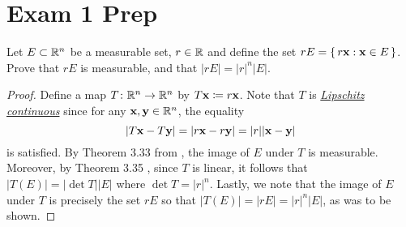 \section{Exam 1 Prep}
\begin{problem}
Let $E\subset\mathbb{R}^n$ be a measurable set, $r\in\mathbb{R}$ and define the set
$rE=\left\{\,r\mathbf{x}:\mathbf{x}\in E\,\right\}$. Prove that $rE$ is
measurable, and that $|rE|=|r|^n|E|$.
\end{problem}
\begin{proof}
Define a map $T\colon\mathbb{R}^n\to\mathbb{R}^n$ by $T\mathbf{x}\coloneqq r\mathbf{x}$. Note
that $T$ is
\href{https://en.wikipedia.org/wiki/Lipschitz_continuity}{\emph{Lipschitz
    continuous}} since for any $\mathbf{x},\mathbf{y}\in\mathbb{R}^n$, the equality
\begin{equation}
\label{eq:sp16:1:1}
|T\mathbf{x}-T\mathbf{y}|=|r\mathbf{x}-r\mathbf{y}|=|r||\mathbf{x}-\mathbf{y}|
\end{equation}
is satisfied. By Theorem 3.33 from \cite[\S 3.3,
p.\@55]{wheeden-zygmund}, the image of $E$ under $T$ is
measurable. Moreover, by Theorem 3.35 \cite[\S 3.3, p.\@
56]{wheeden-zygmund}, since $T$ is linear, it follows that
$|T(E)|=|{\det T}||E|$ where $\det T=|r|^n$. Lastly, we note that the image
of $E$ under $T$ is precisely the set $rE$ so that $|T(E)|=|rE|=|r|^n|E|$,
as was to be shown.
\end{proof}

